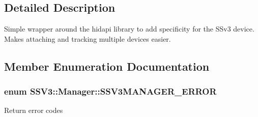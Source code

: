 \subsection{Detailed Description}
Simple wrapper around the hidapi library to add specificity for the S\-Sv3 device. Makes attaching and tracking multiple devices easier. 

\subsection{Member Enumeration Documentation}
\hypertarget{classSSV3_1_1Manager_a29b6ac14b348cc4676523f74f8d0a8e1}{
\subsubsection[{S\-S\-V3\-M\-A\-N\-A\-G\-E\-R\-\_\-\-E\-R\-R\-O\-R}]{\setlength{\rightskip}{0pt plus 5cm}enum {\bf S\-S\-V3\-::\-Manager\-::\-S\-S\-V3\-M\-A\-N\-A\-G\-E\-R\-\_\-\-E\-R\-R\-O\-R}\hspace{0.3cm}{\ttfamily [strong]}}}\label{classSSV3_1_1Manager_a29b6ac14b348cc4676523f74f8d0a8e1}
Return error codes 


